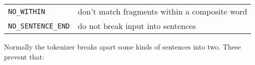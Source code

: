 \documentclass[]{article}
\begin{document}
\begin{longtable}[]{@{}ll@{}}
\begin{minipage}[t]{0.07\columnwidth}
\texttt{NO\_WITHIN}\strut
\end{minipage} & \begin{minipage}[t]{0.10\columnwidth}\raggedright\strut
don't match fragments within a composite word\strut
\end{minipage}\tabularnewline
\begin{minipage}[t]{0.07\columnwidth}\raggedright\strut
\texttt{NO\_SENTENCE\_END}\strut
\end{minipage} & \begin{minipage}[t]{0.10\columnwidth}\raggedright\strut
do not break input into sentences\strut
\end{minipage}\tabularnewline
\bottomrule
\end{longtable}

Normally the tokenizer breaks apart some kinds of sentences into two.
These prevent that:
\end{document}
